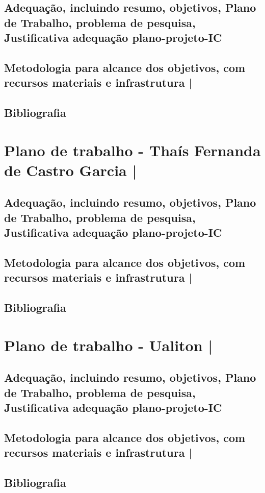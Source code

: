 \documentclass{article}
\begin{document}
\subsection{ Adequação, incluindo resumo, objetivos, Plano de Trabalho, problema de
pesquisa, Justificativa adequação plano-projeto-IC}
\subsection{Metodologia para alcance dos objetivos, com recursos materiais e infrastrutura |}
\subsection{Bibliografia}

\section{Plano de trabalho - Thaís Fernanda de Castro Garcia | }
\subsection{ Adequação, incluindo resumo, objetivos, Plano de Trabalho, problema de
pesquisa, Justificativa adequação plano-projeto-IC}
\subsection{Metodologia para alcance dos objetivos, com recursos materiais e infrastrutura |}
\subsection{Bibliografia}

\section{Plano de trabalho - Ualiton  | }
\subsection{ Adequação, incluindo resumo, objetivos, Plano de Trabalho, problema de
pesquisa, Justificativa adequação plano-projeto-IC}
\subsection{Metodologia para alcance dos objetivos, com recursos materiais e infrastrutura |}
\subsection{Bibliografia}
\end{document}
